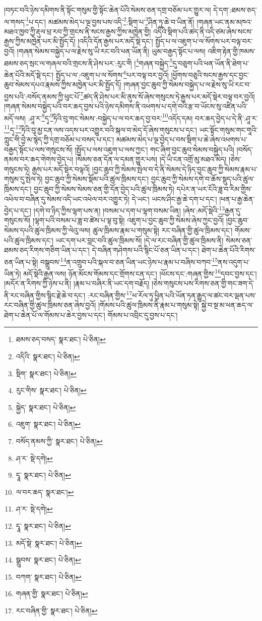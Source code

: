 །བཏང་བའི་ཉེས་དམིགས་ནི་སྟོང་གསུམ་གྱི་སྟོང་ཆེན་པོའི་སེམས་ཅན་དགྲ་བཅོམ་པར་གྱུར་ལ། དེ་དག་:ཐམས་ཅད་ལ་གསད་\footnote{ཐམས་ཅད་བསད་  སྣར་ཐང་།  པེ་ཅིན། }པ་དང་། མཚམས་མེད་པ་ལྔ་བྱས་པས་འདི་\footnote{འདིའི་  སྣར་ཐང་།  པེ་ཅིན། }:སྡིག་པ་\footnote{སྡིག་  སྣར་ཐང་།  པེ་ཅིན། }ཤིན་ཏུ་ཆེ་བ་ཡིན་ནོ། །གཞན་ཡང་ནམ་མཁའ་མཐའ་ཁྱབ་ཀྱི་རྡུལ་ཕྲ་རབ་ཀྱི་གྲངས་ནི་སངས་རྒྱས་ཀྱིས་མཁྱེན་གྱི། འདིའི་སྡིག་པའི་ཚད་ནི་འདི་ཙམ་ཞེས་སངས་རྒྱས་ཀྱིས་མཁྱེན་པར་མི་སྤྱོད་དོ། །འདིའི་དོན་རྒྱས་པར་མདོ་སྡེ་དང་། སྤྱོད་པ་ལ་འཇུག་པ་ལ་སོགས་པར་བལྟ་བར་བྱའོ། །གཞན་སེམས་བསྐྱེད་པ་ལ་རྗེས་སུ་ཡི་རང་བའི་ཕན་ཡོན་ནི། ཡུམ་བརྒྱད་སྟོང་པ་ལས། འཇིག་རྟེན་གྱི་ཁམས་ཐམས་ཅད་སྲང་ལ་གཞལ་བའི་གྲངས་ནི་ཤེས་པར་:རུང་གི །\footnote{རུང་གིས་  སྣར་ཐང་།  པེ་ཅིན། }གཞན་བསྐྱེད་\footnote{སྐྱེད་  སྣར་ཐང་།  པེ་ཅིན། }དུ་བཅུག་པའི་ཕན་ཡོན་ནི་ཐེག་པ་ཆེན་པོའི་མདོ་སྡེ་དང་། སྤྱོད་པ་ལ་:འཇུག་པ་ལ་སོགས་\footnote{འཇུག་  སྣར་ཐང་།  པེ་ཅིན། }པར་བལྟ་བར་བྱའོ། །ཕྱོགས་བཅུའི་སངས་རྒྱས་དང་བྱང་ཆུབ་སེམས་དཔའ་རྣམས་ཀྱིས་མཁྱེན་པར་མི་སྤྱོད་དོ། །གཞན་བྱང་ཆུབ་ཀྱི་སེམས་བསྐྱེད་པ་ལ་རྗེས་སུ་ཡི་རང་བ་བྱས་པའི་:བསོད་ནམས་ཀྱི་ཕུང་པོ་\footnote{བསོད་ནམས་ཀྱི་  སྣར་ཐང་།  པེ་ཅིན། }ཚད་ནི་ཤེས་པར་མི་ནུས་སོ་ཞེས་གསུངས་ཏེ་རྒྱས་པར་མདོ་སྡེར་བལྟ་བར་བྱའོ། །གཞན་སེམས་བསྐྱེད་པའི་བར་ཆད་བྱས་པའི་ཉེས་དམིགས་ནི་འཕགས་པ་དགེ་བའི་རྩ་བ་ཡོངས་སུ་འཛིན་པའི་མདོ་ལས། :ཤཱ་ར་\footnote{ཤ་ར་  སྡེ་དགེ། }དྭ་\footnote{དྭཱ་  སྣར་ཐང་།  པེ་ཅིན། }ཏིའི་བུ་གང་སེམས་:བསྐྱེད་པ་ལ་བར་ཆད་བྱ་བར་\footnote{ལ་བར་ཆད་  སྣར་ཐང་། }འདོད་དམ། བར་ཆད་བྱེད་པ་དེ་ནི་:ཤཱ་ར་\footnote{ཤ་ར་  སྡེ་དགེ། }དྭ་\footnote{དྭཱ་  སྣར་ཐང་།  པེ་ཅིན། }ཏིའི་བུ་མྱ་ངན་ལས་འདས་པར་འགྱུར་བའི་སྐལ་བ་མེད་དོ་ཞེས་གསུངས་པ་དང་། ཡང་སྟོང་གསུམ་གང་གཱའི་ཀླུང་གི་བྱེ་མ་སྙེད་ཀྱི་དགྲ་བཅོམ་པ་བསད་པ་དང་། མཚམས་མེད་པ་ལྔ་བྱེད་པ་བས་སྡིག་པ་ཆེ་ཞེས་འཕགས་པ་བརྒྱད་སྟོང་པ་ལས་གསུངས་སོ། །སྤྱོད་པ་ལས་འཇུག་པ་ལས་ཀྱང་། གང་ཞིག་བྱང་ཆུབ་སེམས་བསྐྱེད་པའི། །བསོད་ནམས་བར་ཆད་གེགས་བྱེད་པ། །སེམས་ཅན་དོན་ལ་དམན་གྱུར་པས། །དེ་ཡི་ངན་འགྲོ་མུ་མཐའ་མེད། །ཅེས་གསུངས་ཏེ། རྒྱས་པར་མདོ་སྡེར་བལྟའོ། །བྱང་ཆུབ་ཀྱི་སེམས་སྤེལ་བ་དེ་ནི་སེམས་དེ་ཉིད་བྱང་ཆུབ་ཀྱི་སེམས་རྣམ་པ་གསུམ་དུ་སྤེལ་ཏེ། བྱང་ཆུབ་ཀྱི་སེམས་སྡོམ་པའི་ཚུལ་ཁྲིམས་དང་། བྱང་ཆུབ་ཀྱི་སེམས་དགེ་བ་ཆོས་སྡུད་པའི་ཚུལ་ཁྲིམས་དང་། བྱང་ཆུབ་ཀྱི་སེམས་སེམས་ཅན་གྱི་དོན་བྱེད་པའི་ཚུལ་ཁྲིམས་ཏེ། དཔེར་ན་ཡར་ངོའི་ཟླ་བ་རིམ་གྱིས་འཕེལ་བ་བཞིན་དུ་སེམས་འདི་ཡང་འཕེལ་བར་འགྱུར་ཏེ། དེ་ཡང་། ཡངས་ཤིང་རྒྱ་ཆེ་དག་པ་དང་། །ཕན་པ་རྒྱ་ཆེན་བྱེད་པ་དང་། །དགེ་བ་ཉིད་ཀྱིས་ལྷག་པས་ན། །བསམ་པ་དག་པ་ལྷག་བསམ་ཡིན། །ཞེས་:མདོ་སྡེའི་\footnote{མདོ་སྡེ་  སྣར་ཐང་།  པེ་ཅིན། }རྒྱན་དུ་གསུངས་སོ། །ལྷག་པའི་བསམ་པ་ཟླ་བ་ཚེས་པ་ལྟ་བུ་སྟེ། འཇུག་པ་བྱང་ཆུབ་ཀྱི་སེམས་ཞེས་ཀྱང་བྱའོ། །བྱང་ཆུབ་སེམས་དཔའི་ཚུལ་ཁྲིམས་ཀྱི་ལེའུ་ལས། ཚུལ་ཁྲིམས་རྣམ་པ་གསུམ་སྟེ། རང་བཞིན་གྱི་ཚུལ་ཁྲིམས་དང་། གོམས་པའི་ཚུལ་ཁྲིམས་དང་། ཡང་དག་པར་བླང་བའི་ཚུལ་ཁྲིམས་སོ། །དེ་ལ་རང་བཞིན་གྱི་ཚུལ་ཁྲིམས་ནི། སེམས་ཅན་ཐམས་ཅད་རིགས་གཅིག་ཡིན་པ་དང་། དེ་བཞིན་གཤེགས་པའི་སྙིང་པོ་ཅན་ཡིན་པ་དང་། ཐེག་པ་ཆེན་པོའི་རིགས་ཅན་ཡིན་པ་སྟེ། བསྒྲུབས་\footnote{སྒྲུབས་  སྣར་ཐང་།  པེ་ཅིན། }ན་འགྲུབ་པའི་སྐལ་བ་ཅན་ཡིན་ཡང་ཉེས་པ་རྣམ་པ་བཞིས་བཀབ་\footnote{བཀག་  སྣར་ཐང་།  པེ་ཅིན། }ནས་འདུག་པ་ཡིན་ཏེ། མདོ་སྡེའི་རྒྱན་ལས། ཉོན་མོངས་གོམས་དང་གྲོགས་ངན་དང་། །ཕོངས་དང་:གཞན་གྱིས་\footnote{གཞན་གྱི་  སྣར་ཐང་།  པེ་ཅིན། }དབང་བྱས་དང་། །མདོར་ན་རིགས་ཀྱི་ཉེས་པ་ནི། །རྣམ་པ་བཞིར་ནི་ཡང་དག་བརྗོད། །ཅེས་གསུངས་པས་རིགས་ཅན་གྱི་གང་ཟག་དེ་ནི་རང་བཞིན་གྱིས་སྙིང་རྗེ་ཆེ་བ་དང་། :རང་བཞིན་གྱིས་\footnote{རང་བཞིན་གྱི་  སྣར་ཐང་།  པེ་ཅིན། }ཕ་རོལ་ཏུ་ཕྱིན་པའི་ཡོན་ཏན་རྒྱུད་ལ་ཚང་བར་ལྡན་པས་རང་བཞིན་གྱི་ཚུལ་ཁྲིམས་ཅན་ཞེས་བྱའོ། །གོམས་པའི་ཚུལ་ཁྲིམས་ནི་རྣམ་པ་གསུམ་སྟེ། སྐྱེ་བ་སྔ་མ་ཕན་ཆད་ལ་ཐེག་པ་ཆེན་པོ་ལ་གོམས་པ་ཆེར་བྱས་པ་དང་། གོམས་པ་འབྲིང་དུ་བྱས་པ་དང་། 
